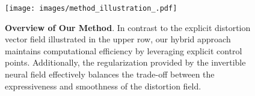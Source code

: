 {
\begin{figure}[t]
    \centering
    {\texttt{[image: images/method\_illustration\_.pdf]}}
    \caption{
    \textbf{Overview of Our Method}. In contrast to the explicit distortion vector field illustrated in the upper row, our hybrid approach maintains computational efficiency by leveraging explicit control points. Additionally, the regularization provided by the invertible neural field effectively balances the trade-off between the expressiveness and smoothness of the distortion field.
    }
    \label{fig:pipeline}
    \vspace{-1.em}
\end{figure}
}